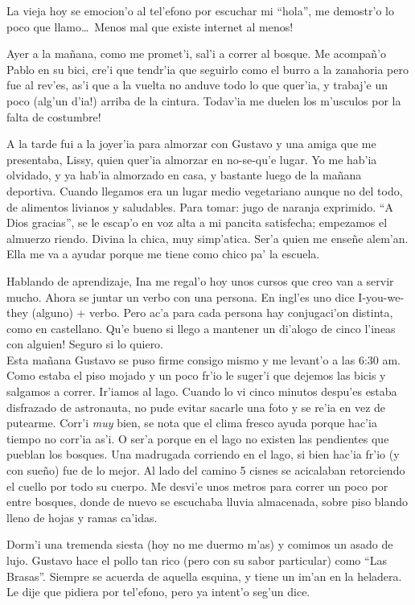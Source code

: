 La vieja hoy se emocion'o al tel'efono por escuchar mi ``hola'', me demostr'o lo
poco que llamo\ldots\ \textexclamdown Menos mal que existe internet al menos!

Ayer a la ma\~nana, como me promet'i, sal'i a correr al bosque. Me acompa\~n'o
Pablo en su bici, cre'i que tendr'ia que seguirlo como el burro a la zanahoria
pero fue al rev'es, as'i que a la vuelta no anduve todo lo que quer'ia, y
trabaj'e un poco (\textexclamdown alg'un d'ia!) arriba de la cintura.
\textexclamdown Todav'ia me duelen los m'usculos por la falta de costumbre!

A la tarde fui a la joyer'ia para almorzar con Gustavo y una amiga que
me presentaba, Lissy, quien quer'ia almorzar en no-se-qu'e lugar. Yo me hab'ia
olvidado, y ya hab'ia almorzado en casa, y bastante luego de la ma\~nana
deportiva. Cuando llegamos era un lugar medio vegetariano aunque no del todo, de
alimentos livianos y saludables. Para tomar: jugo de naranja exprimido. ``A Dios
gracias'', se le escap'o en voz alta a mi pancita satisfecha; empezamos el
almuerzo riendo. Divina la chica, muy simp'atica. Ser'a quien me ense\~ne
alem'an. Ella me va a ayudar porque me tiene como chico pa' la escuela.

Hablando de aprendizaje, Ina me regal'o hoy unos cursos que creo van a servir
mucho. Ahora se juntar un verbo con una persona. En ingl'es uno dice
I-you-we-they (alguno) + verbo. Pero ac'a para cada persona hay conjugaci'on
distinta, como en castellano. \textexclamdown Qu'e bueno si llego a mantener
un di'alogo de cinco l'ineas con alguien! Seguro si lo quiero.\\

Esta ma\~nana Gustavo se puso firme consigo mismo y me levant'o a las 6:30 am.
Como estaba el piso mojado y un poco fr'io le suger'i que dejemos las bicis y
salgamos a correr. Ir'iamos al lago. Cuando lo vi cinco minutos despu'es estaba
disfrazado de astronauta, no pude evitar sacarle una foto y se re'ia en vez de
putearme. Corr'i \emph{muy} bien, se nota que el clima fresco ayuda porque
hac'ia tiempo no corr'ia as'i. O ser'a porque en el lago no existen las
pendientes que pueblan los bosques. Una madrugada corriendo en el lago, si bien
hac'ia fr'io (y con sue\~no) fue de lo mejor. Al lado del camino 5 cisnes se
acicalaban retorciendo el cuello por todo su cuerpo. Me desvi'e unos metros para
correr un poco por entre bosques, donde de nuevo se escuchaba lluvia almacenada,
sobre piso blando lleno de hojas y ramas ca'idas.

Dorm'i una tremenda siesta (hoy no me duermo m'as) y comimos un asado de lujo.
Gustavo hace el pollo tan rico (pero con su sabor particular) como ``Las
Brasas''. Siempre se acuerda de aquella esquina, y tiene un im'an en la
heladera. Le dije que pidiera por tel'efono, pero ya intent'o seg'un dice.

